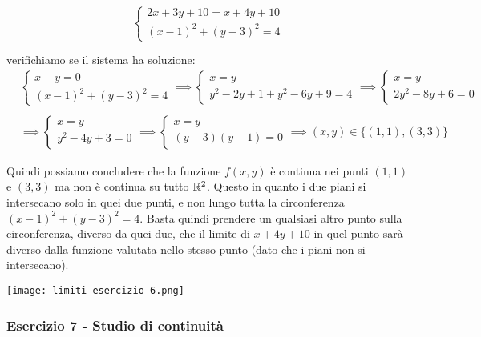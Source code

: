 \begin{equation*}
    \begin{cases}
        2x+3y+10 = x +4y +10 \\
        {(x-1)}^{2} + {(y-3)}^{2} = 4
    \end{cases}
\end{equation*}

verifichiamo se il sistema ha soluzione:
\begin{align*}
    & \begin{cases}
        x-y=0 \\
        {(x-1)}^{2} + {(y-3)}^{2} = 4
    \end{cases}\implies
    \begin{cases}
        x=y \\
        y^{2}-2y+1+y^{2}-6y+9=4
    \end{cases} \implies
    \begin{cases}
        x=y \\
        2y^{2}-8y + 6 = 0
    \end{cases}\\ \\
    & \implies \begin{cases}
        x=y \\
        y^{2}-4y+3=0
    \end{cases} \implies
    \begin{cases}
        x=y \\
        (y-3)(y-1) = 0
    \end{cases} \implies
    (x,y) \in \{(1,1), (3,3)\}
\end{align*}

Quindi possiamo concludere che la funzione \(f(x,y)\) è continua nei punti \((1,1)\) e \((3,3)\) ma non è continua su tutto \(\mathbb{R}^2\). Questo in quanto i due piani si intersecano solo in quei due punti, e non lungo tutta la circonferenza \({(x-1)}^{2}+{(y-3)}^{2} = 4\). Basta quindi prendere un qualsiasi altro punto sulla circonferenza, diverso da quei due, che il limite di \(x+4y+10\) in quel punto sarà diverso dalla funzione valutata nello stesso punto (dato che i piani non si intersecano).

\begin{center}
    \texttt{[image: limiti-esercizio-6.png]}
\end{center}

\filbreak{}
\subsubsection*{Esercizio 7 {-} Studio di continuità}

